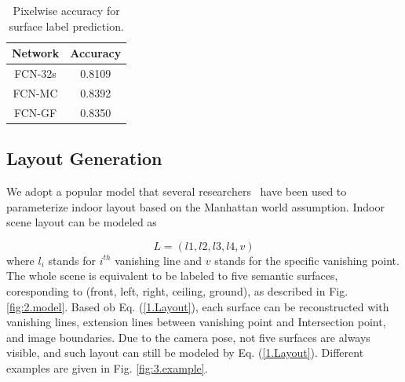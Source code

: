 \begin{table}
	\centering
	\caption{Pixelwise accuracy for surface label prediction.}
	\label{table:fcn-accuracy}
	\begin{tabular}{c|c}
		\hline
	Network & Accuracy\\
	\hline
	FCN-32s & 0.8109 \\ 
	FCN-MC  & 0.8392 \\
	FCN-GF  & 0.8350 \\
		\hline
	\end{tabular}
		
\end{table}







\subsection{Layout Generation}
\label{subsection:optimization}
We adopt a popular model that several  researchers~\cite{hedau2009recovering,dasgupta2016delay,ren2016coarse} have been used to parameterize indoor layout based on the Manhattan world assumption. 
Indoor scene layout can be modeled as 

\begin{equation}
	\label{eq:Layout}
	L = (l1, l2, l3, l4, v)
\end{equation}
where $l_{i}$ stands for $i^{th}$ vanishing line and $v$ stands for the specific vanishing point. The whole scene is equivalent to be labeled to five semantic surfaces, coresponding to (front, left, right, ceiling, ground), as described in Fig. \ref{fig:2.model}. Based ob Eq. (\ref{1.Layout}), each surface can be reconstructed with vanishing lines, extension lines between vanishing point and Intersection point, and image boundaries. Due to the camera pose, not five surfaces are always visible, and such layout can still be modeled by Eq. (\ref{1.Layout}). Different examples are given in Fig. \ref{fig:3.example}.